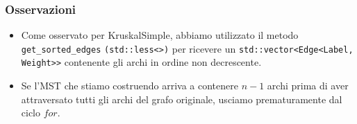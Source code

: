 \subsubsection{Osservazioni}
\begin{itemize}
    \item Come osservato per KruskalSimple, abbiamo utilizzato il metodo  \texttt{get_sorted_edges} \texttt{(std::less<>{})} per ricevere un \texttt{std::vector<Edge<Label, Weight>>} contenente gli archi in ordine non decrescente. \\
    
    \item Se l'MST che stiamo costruendo arriva a contenere $n - 1$ archi prima di aver attraversato tutti gli archi del grafo originale, usciamo prematuramente dal ciclo $for$. \\
    
\end{itemize}


